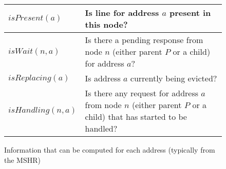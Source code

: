 \begin{figure}\centering
\begin{tabularx}{\linewidth}{|l|X|}
\hline
$isPresent(a)$ & Is line for address $a$ present in this node?\\
\hline
$isWait(n, a)$ & Is there a pending response from node $n$ (either parent $P$
or a child) for address $a$?\\
\hline
$isReplacing(a)$ & Is address $a$ currently being evicted?\\
\hline
$isHandling(n, a)$ & Is there any request for address $a$ from node $n$ (either
parent $P$ or a child) that has started to be handled?\\
\hline
\end{tabularx}
\caption{Information that can be computed for each address (typically from the
MSHR)}
\label{table:functions}
\end{figure}


